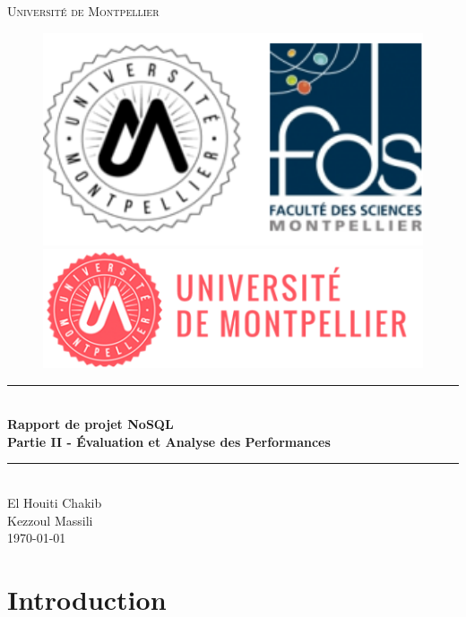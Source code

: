 \documentclass[12pt,titlepage]{article}
\begin{document}
\begin{titlepage}
\newcommand{\HRule}{\rule{\linewidth}{0.5mm}}
\center
\textsc{\LARGE
Université de Montpellier
} \\[1cm]
\begin{figure}[h]
	\begin{minipage}[c]{.46\linewidth}
		\centering
		\includegraphics[width=1\textwidth]{img/fds.png}
	\end{minipage}
	\hfill%
	\begin{minipage}[c]{.46\linewidth}
		\centering
		\includegraphics[width=1\textwidth]{img/univ-montpellier.png}
	\end{minipage}
\end{figure}

\HRule \\[0.4cm]
{ \huge \bfseries Rapport de projet NoSQL \\ Partie II - Évaluation et Analyse des Performances}
\HRule \\[1.5cm]
El Houiti Chakib \\
Kezzoul Massili
\\[1cm]
\today \\ [1cm]
\end{titlepage}

\section*{Introduction}
\end{document}
